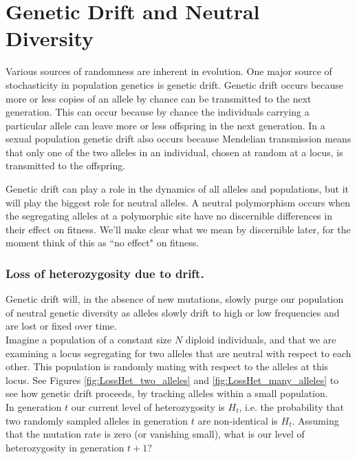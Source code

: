 \chapter{Genetic Drift and Neutral Diversity}

Various sources of randomness are inherent in evolution.  One major source of
stochasticity in population genetics is genetic drift.  Genetic drift occurs
because more or less copies of an allele by chance can be transmitted to the
next generation. This can occur because by chance the individuals carrying a
particular allele can leave more or less offspring in the next generation. In a
sexual population genetic drift also occurs because Mendelian transmission
means that only one of the two alleles in an individual, chosen at random at a
locus, is transmitted to the offspring. 

Genetic drift can play a role in the dynamics of all alleles and populations,
but it will play the biggest role for neutral alleles. A neutral polymorphism
occurs when the segregating alleles at a polymorphic site have no discernible
differences in their effect on fitness. We'll make clear what we mean by discernible later, for
the moment think of this as ``no effect" on fitness. 


\subsection{Loss of heterozygosity due to drift.} \label{LossofHet} 

Genetic drift will, in the absence of new mutations, slowly purge our
population of neutral genetic diversity as alleles slowly drift to high or low
frequencies and are lost or fixed over time. \\

Imagine a population of a constant size $N$ diploid individuals, and that we
are examining a locus segregating for two alleles that are neutral with respect
to each other.  This population is randomly mating with respect to the alleles
at this locus. See Figures \ref{fig:LossHet_two_alleles} and
\ref{fig:LossHet_many_alleles} to see how genetic drift proceeds, by tracking
alleles within a small population. \\

In generation $t$ our current level of heterozygosity is $H_t$,
i.e. the probability that two randomly sampled alleles in generation
$t$ are non-identical is $H_t$. Assuming that the mutation rate is
zero (or vanishing small), what is our level of heterozygosity in
generation $t+1$?\\

